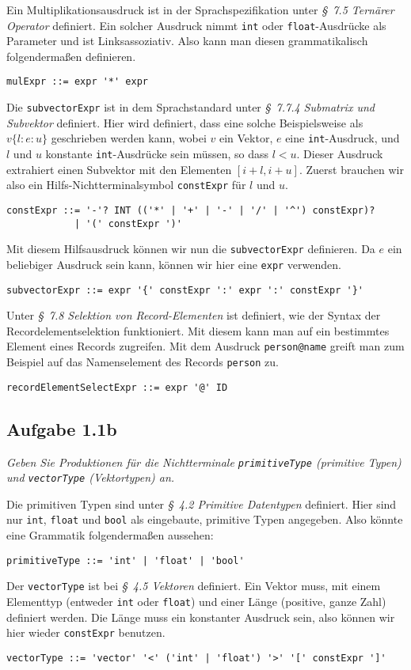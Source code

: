 \documentclass[
  ngerman,
  DIV=14
]{scrartcl}
\begin{document}
\bigskip\noindent
Ein Multiplikationsausdruck ist in der Sprachspezifikation unter \emph{§~7.5 Ternärer Operator} definiert. Ein solcher Ausdruck nimmt \verb|int| oder \verb|float|-Ausdrücke als Parameter und ist Linksassoziativ. Also kann man diesen grammatikalisch folgendermaßen definieren. 
\begin{lstlisting}
mulExpr ::= expr '*' expr
\end{lstlisting}
Die \verb|subvectorExpr| ist in dem Sprachstandard unter \emph{§~7.7.4 Submatrix und Subvektor} definiert. Hier wird definiert, dass eine solche Beispielsweise als $v\{l:e:u\}$ geschrieben werden kann, wobei $v$ ein Vektor, $e$ eine \texttt{int}-Ausdruck, und $l$ und $u$ konstante \texttt{int}-Ausdrücke sein müssen, so dass $l < u$. Dieser Ausdruck extrahiert einen Subvektor mit den Elementen $[i+l, i+u]$. Zuerst brauchen wir also ein Hilfs-Nichtterminalsymbol \texttt{constExpr} für $l$ und $u$.
\begin{lstlisting}
constExpr ::= '-'? INT (('*' | '+' | '-' | '/' | '^') constExpr)?
            | '(' constExpr ')'
\end{lstlisting}
Mit diesem Hilfsausdruck können wir nun die \texttt{subvectorExpr} definieren. Da $e$ ein beliebiger Ausdruck sein kann, können wir hier eine \texttt{expr} verwenden. 
\begin{lstlisting}
subvectorExpr ::= expr '{' constExpr ':' expr ':' constExpr '}'  
\end{lstlisting}
Unter \emph{§~7.8 Selektion von Record-Elementen} ist definiert, wie der Syntax der Recordelementselektion funktioniert. Mit diesem kann man auf ein bestimmtes Element eines Records zugreifen. Mit dem Ausdruck \texttt{person@name} greift man zum Beispiel auf das Namenselement des Records \texttt{person} zu. 
\begin{lstlisting}
recordElementSelectExpr ::= expr '@' ID  
\end{lstlisting}

\subsection*{Aufgabe 1.1b}

\emph{Geben Sie Produktionen für die Nichtterminale \texttt{primitiveType} (primitive Typen) und \texttt{vectorType} (Vektortypen) an.}

\bigskip\noindent
Die primitiven Typen sind unter \emph{§~4.2 Primitive Datentypen} definiert. Hier sind nur \texttt{int}, \texttt{float} und \texttt{bool} als eingebaute, primitive Typen angegeben. Also könnte eine Grammatik folgendermaßen aussehen:
\begin{lstlisting}
primitiveType ::= 'int' | 'float' | 'bool'
\end{lstlisting}
Der \texttt{vectorType} ist bei \emph{§~4.5 Vektoren} definiert. Ein Vektor muss, mit einem Elementtyp (entweder \texttt{int} oder \texttt{float}) und einer Länge (positive, ganze Zahl) definiert werden. Die Länge muss ein konstanter Ausdruck sein, also können wir hier wieder \texttt{constExpr} benutzen.
\begin{lstlisting}
vectorType ::= 'vector' '<' ('int' | 'float') '>' '[' constExpr ']'
\end{lstlisting}
\end{document}
